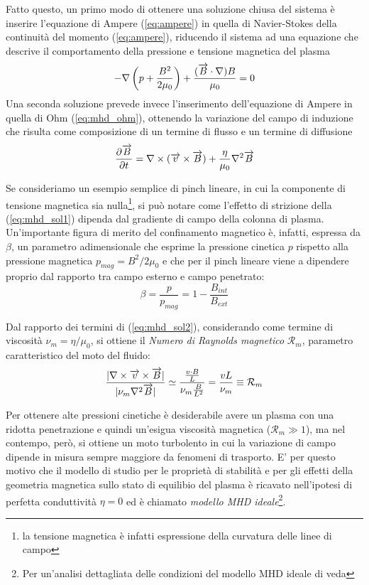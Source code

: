 Fatto questo, un primo modo di ottenere una soluzione chiusa del sistema
è inserire l'equazione di Ampere (\ref{eq:ampere}) in quella di
Navier-Stokes della continuità del momento (\ref{eq:ampere}), riducendo
il sistema ad una equazione che descrive il comportamento della
pressione e tensione magnetica del plasma
\begin{equation}
 \label{eq:mhd_sol1}
 -\nabla \left( p+\frac{B^2}{2\mu_0} \right) + \frac{
  (\overrightarrow{B}\cdot\nabla)B}{\mu_0} = 0
\end{equation}
Una seconda soluzione prevede invece l'inserimento dell'equazione di
Ampere in quella di Ohm (\ref{eq:mhd_ohm}), ottenendo la variazione del
campo di induzione che risulta come composizione di un termine di flusso
e un termine di diffusione
\begin{equation}
\label{eq:mhd_sol2}
 \frac{\partial \overrightarrow{B}}{\partial t} = \nabla \times (\overrightarrow{v} \times \overrightarrow{B}) +
  \frac{\eta}{\mu_0} \nabla^2\overrightarrow{B}
\end{equation}

Se consideriamo un esempio semplice di pinch lineare, in cui la
componente di tensione magnetica sia nulla\footnote{la tensione
magnetica è infatti espressione della curvatura delle linee di campo},
si può notare come l'effetto di strizione della (\ref{eq:mhd_sol1})
dipenda dal gradiente di campo della colonna di plasma. Un'importante
figura di merito del confinamento magnetico è, infatti, espressa da
$\beta$, un parametro adimensionale che esprime la pressione cinetica
$p$ rispetto alla pressione magnetica $p_{mag} = B^2/2\mu_0$ e che per
il pinch lineare viene a dipendere proprio dal rapporto tra campo
esterno e campo penetrato:
\begin{equation}
\beta = \frac{p}{p_{mag}} = 1-\frac{B_{int}}{B_{ext}}
\end{equation}

Dal rapporto dei termini di (\ref{eq:mhd_sol2}), considerando come
termine di viscosità $\nu_m=\eta/\mu_0$, si ottiene il \emph{Numero di
Raynolds magnetico} $\mathcal{R}_m$, parametro caratteristico del moto
del fluido:
\begin{equation}
 \frac{\vert \nabla\times\overrightarrow{v}\times\overrightarrow{B}\vert}
  {\vert \nu_m\nabla^2\overrightarrow{B}\vert} \simeq
  \frac{ \frac{v \cdot B}{L} }{ \nu_m \frac{B}{L^2}} = 
  \frac{vL}{\nu_m} \equiv \mathcal{R}_m
\end{equation}

Per ottenere alte pressioni cinetiche è desiderabile avere un plasma con
una ridotta penetrazione e quindi un'esigua viscosità magnetica
($\mathcal{R}_m\gg1$), ma nel contempo, però, si ottiene un moto
turbolento in cui la variazione di campo dipende in misura sempre
maggiore da fenomeni di trasporto.  E' per questo motivo che il modello
di studio per le proprietà di stabilità e per gli effetti della
geometria magnetica sullo stato di equilibio del plasma è ricavato
nell'ipotesi di perfetta conduttività $\eta = 0$ ed è chiamato
\emph{modello MHD ideale}\footnote{Per un'analisi dettagliata delle
condizioni del modello MHD ideale di veda\cite{fridberg}\cite{pizz27}}.

